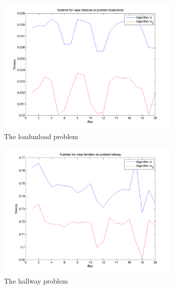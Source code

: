 \documentclass[10pt,a4paper]{article}
\begin{document}

\begin{figure}
\vspace{-20pt}
\hspace{-30pt}
\centering
\includegraphics[width=0.8\textwidth]{Timings/loadunload/timings_vi.png}
\hspace{-30pt}
\caption{The loadunload problem}
\label{fig:vi_loadunload}
\vspace{-20pt}
\end{figure}

\begin{figure}
\vspace{-20pt}
\hspace{-30pt}
\centering
\includegraphics[width=0.8\textwidth]{Timings/hallway/timings_vi.png}
\caption{The hallway problem}
\hspace{-30pt}
\label{fig:vi_hallway}
\vspace{-20pt}
\end{figure}
        
\end{document}
